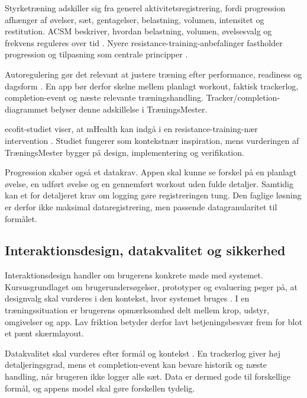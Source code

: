 Styrketræning adskiller sig fra generel aktivitetsregistrering, fordi progression afhænger af øvelser, sæt, gentagelser, belastning, volumen, intensitet og restitution. ACSM beskriver, hvordan belastning, volumen, øvelsesvalg og frekvens reguleres over tid \cite{acsm2009_progression_models}. Nyere resistance-training-anbefalinger fastholder progression og tilpasning som centrale principper \cite{currier2026_acsm_resistance_training}.

Autoregulering gør det relevant at justere træning efter performance, readiness og dagsform \cite{greig2020_autoregulation_resistance_training,larsen2021_autoregulation_systematic_review}. En app bør derfor skelne mellem planlagt workout, faktisk trackerlog, completion-event og næste relevante træningshandling. Tracker/completion-diagrammet belyser denne adskillelse i TræningsMester.

ecofit-studiet viser, at mHealth kan indgå i en resistance-training-nær intervention \cite{plotnikoff2023_ecofit_rct}. Studiet fungerer som kontekstnær inspiration, mens vurderingen af TræningsMester bygger på design, implementering og verifikation.

Progression skaber også et datakrav. Appen skal kunne se forskel på en planlagt øvelse, en udført øvelse og en gennemført workout uden fulde detaljer. Samtidig kan et for detaljeret krav om logging gøre registreringen tung. Den faglige løsning er derfor ikke maksimal dataregistrering, men passende datagranularitet til formålet.

\subsection{Interaktionsdesign, datakvalitet og sikkerhed}

Interaktionsdesign handler om brugerens konkrete møde med systemet. Kursusgrundlaget om brugerundersøgelser, prototyper og evaluering peger på, at designvalg skal vurderes i den kontekst, hvor systemet bruges \cite{hornbaek2024_brugerundersoegelser,hornbaek2024_prototyper,hornbaek2024_evaluering}. I en træningssituation er brugerens opmærksomhed delt mellem krop, udstyr, omgivelser og app. Lav friktion betyder derfor lavt betjeningsbesvær frem for blot et pænt skærmlayout.

Datakvalitet skal vurderes efter formål og kontekst \cite{mohammed2025_five_facets_data_quality}. En trackerlog giver høj detaljeringsgrad, mens et completion-event kan bevare historik og næste handling, når brugeren ikke logger alle sæt. Data er dermed gode til forskellige formål, og appens model skal gøre forskellen tydelig.

